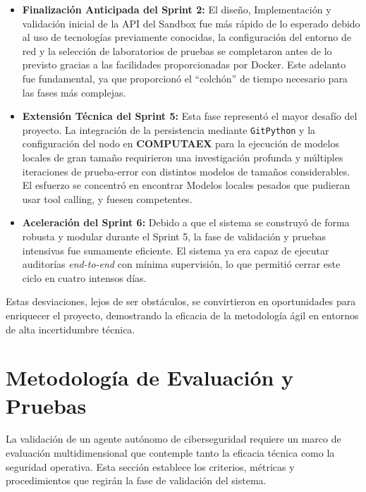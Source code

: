 \begin{itemize}
    \item \textbf{Finalización Anticipada del Sprint 2:} El diseño, Implementación y validación inicial de la API del Sandbox fue más rápido de lo esperado debido al uso de tecnologías previamente conocidas, la configuración del entorno de red y la selección de laboratorios de pruebas se completaron antes de lo previsto gracias a las facilidades proporcionadas por Docker. Este adelanto fue fundamental, ya que proporcionó el ``colchón'' de tiempo necesario para las fases más complejas.
    
    \item \textbf{Extensión Técnica del Sprint 5:} Esta fase representó el mayor desafío del proyecto. La integración de la persistencia mediante \texttt{GitPython} y la configuración del nodo en \textbf{COMPUTAEX} para la ejecución de modelos locales de gran tamaño requirieron una investigación profunda y múltiples iteraciones de prueba-error con distintos modelos de tamaños considerables. El esfuerzo se concentró en encontrar Modelos locales pesados que pudieran usar tool calling, y fuesen competentes.
    
    \item \textbf{Aceleración del Sprint 6:} Debido a que el sistema se construyó de forma robusta y modular durante el Sprint 5, la fase de validación y pruebas intensivas fue sumamente eficiente. El sistema ya era capaz de ejecutar auditorías \textit{end-to-end} con mínima supervisión, lo que permitió cerrar este ciclo en cuatro intensos días.
\end{itemize}

Estas desviaciones, lejos de ser obstáculos, se convirtieron en oportunidades para enriquecer el proyecto, demostrando la eficacia de la metodología ágil en entornos de alta incertidumbre técnica.



\section{Metodología de Evaluación y Pruebas}
\label{sec:metodologia_evaluacion}

La validación de un agente autónomo de ciberseguridad requiere un marco de evaluación multidimensional que contemple tanto la eficacia técnica como la seguridad operativa. Esta sección establece los criterios, métricas y procedimientos que regirán la fase de validación del sistema.

